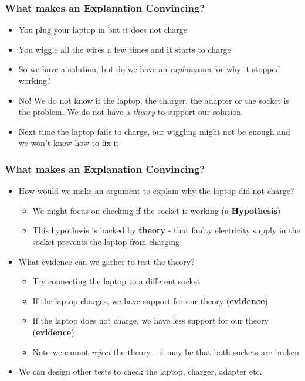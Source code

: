 \documentclass[xcolor=x11names,compress]{beamer}\usepackage[]{graphicx}\usepackage[]{color}
\renewcommand{\(}{\begin{columns}}
\renewcommand{\)}{\end{columns}}
\newcommand{\<}[1]{\begin{column}{#1}}
\renewcommand{\>}{\end{column}}
\begin{document}
\begin{frame}
\frametitle{What makes an Explanation Convincing?}
\begin{itemize}
\item  You plug your laptop in but it does not charge
\pause
\item You wiggle all the wires a few times and it starts to charge
\pause
\item So we have a solution, but do we have an \textit{explanation} for why it stopped working?
\pause
\item No! We do not know if the laptop, the charger, the adapter or the socket is the problem. We do not have a \textit{theory} to support our solution
\pause
\item Next time the laptop fails to charge, our wiggling might not be enough and we won't know how to fix it
\end{itemize}
\end{frame}

\begin{frame}
\frametitle{What makes an Explanation Convincing?}
\begin{itemize}
\item How would we make an argument to explain why the laptop did not charge?
\pause
\begin{itemize}
\item We might focus on checking if the socket is working (a \textbf{Hypothesis})
\pause
\item This hypothesis is backed by \textbf{theory} - that faulty electricity supply in the socket prevents the laptop from charging
\pause
\end{itemize}
\item What evidence can we gather to test the theory?
\pause
\begin{itemize}
\item Try connecting the laptop to a different socket
\pause
\item If the laptop charges, we have support for our theory (\textbf{evidence})
\pause
\item If the laptop does not charge, we have less support for our theory (\textbf{evidence})
\pause
\item Note we cannot \textit{reject} the theory - it may be that both sockets are broken
\pause
\end{itemize}
\item We can design other tests to check the laptop, charger, adapter etc. 
\end{itemize}
\end{frame}
\end{document}
